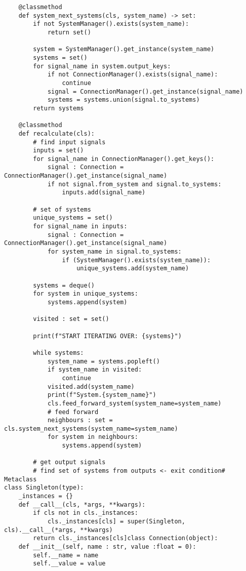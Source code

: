 {\begin{lstlisting}
    @classmethod
    def system_next_systems(cls, system_name) -> set:
        if not SystemManager().exists(system_name):
            return set()
        
        system = SystemManager().get_instance(system_name)
        systems = set()
        for signal_name in system.output_keys:
            if not ConnectionManager().exists(signal_name):
                continue
            signal = ConnectionManager().get_instance(signal_name)
            systems = systems.union(signal.to_systems)
        return systems
    
    @classmethod
    def recalculate(cls):
        # find input signals
        inputs = set()
        for signal_name in ConnectionManager().get_keys():
            signal : Connection = ConnectionManager().get_instance(signal_name)
            if not signal.from_system and signal.to_systems:
                inputs.add(signal_name)
        
        # set of systems
        unique_systems = set()
        for signal_name in inputs:
            signal : Connection = ConnectionManager().get_instance(signal_name)
            for system_name in signal.to_systems:
                if (SystemManager().exists(system_name)):
                    unique_systems.add(system_name)
        
        systems = deque()
        for system in unique_systems:
            systems.append(system)
        
        visited : set = set()
        
        print(f"START ITERATING OVER: {systems}")
        
        while systems:
            system_name = systems.popleft()
            if system_name in visited:
                continue
            visited.add(system_name)
            print(f"System.{system_name}")
            cls.feed_forward_system(system_name=system_name)
            # feed forward
            neighbours : set = cls.system_next_systems(system_name=system_name)
            for system in neighbours:
                systems.append(system)
        
        # get output signals
        # find set of systems from outputs <- exit condition# Metaclass
class Singleton(type):
    _instances = {}
    def __call__(cls, *args, **kwargs):
        if cls not in cls._instances:
            cls._instances[cls] = super(Singleton, cls).__call__(*args, **kwargs)
        return cls._instances[cls]class Connection(object):
    def __init__(self, name : str, value :float = 0):
        self.__name = name
        self.__value = value
        

\end{lstlisting}}
